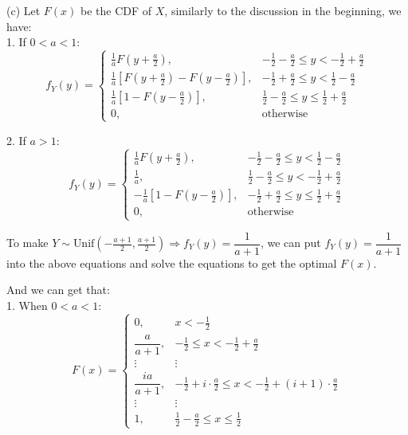 (c) Let $F(x)$ be the CDF of $X$, similarly to the discussion in the beginning, we have: \\
1. If $0<a<1$: \\
$$f_Y(y)=\begin{cases}
\frac{1}{a}F\left(y+\frac{a}{2}\right), & -\frac{1}{2}-\frac{a}{2}\leq y<-\frac{1}{2}+\frac{a}{2} \\
\frac{1}{a}\left[F\left(y+\frac{a}{2}\right) - F\left(y-\frac{a}{2}\right) \right], & -\frac{1}{2}+\frac{a}{2}\leq y<\frac{1}{2}-\frac{a}{2} \\
\frac{1}{a}\left[1-F\left(y-\frac{a}{2}\right)\right], & \frac{1}{2}-\frac{a}{2}\leq y\leq\frac{1}{2}+\frac{a}{2} \\
0, & \text{otherwise}
\end{cases}$$

2. If $a>1$: \\
$$f_Y(y)=\begin{cases}
\frac{1}{a}F\left(y+\frac{a}{2}\right), & -\frac{1}{2}-\frac{a}{2}\leq y<\frac{1}{2}-\frac{a}{2} \\
\frac{1}{a}, & \frac{1}{2}-\frac{a}{2}\leq y<-\frac{1}{2}+\frac{a}{2} \\
-\frac{1}{a}\left[1-F\left(y-\frac{a}{2}\right)\right], & -\frac{1}{2}+\frac{a}{2}\leq y\leq\frac{1}{2}+\frac{a}{2} \\
0, & \text{otherwise}
\end{cases}$$

To make $Y\sim\text{Unif}\left(-\frac{a+1}{2},\frac{a+1}{2}\right)\Rightarrow f_Y(y)=\dfrac{1}{a+1}$, we can put $f_Y(y)=\dfrac{1}{a+1}$ into the above equations and solve the equations to get the optimal $F(x)$.

And we can get that:\\
1. When $0<a<1$:
$$F(x)=\begin{cases}
0, & x<-\frac{1}{2} \\
\dfrac{a}{a+1}, & -\frac{1}{2}\leq x<-\frac{1}{2}+\frac{a}{2} \\
\vdots & \vdots \\
\dfrac{ia}{a+1}, & -\frac{1}{2}+i\cdot\frac{a}{2}\leq x<-\frac{1}{2}+(i+1)\cdot\frac{a}{2} \\
\vdots & \vdots \\
1, & \frac{1}{2}-\frac{a}{2}\leq x\leq\frac{1}{2}
\end{cases}$$

